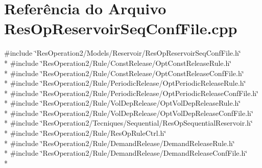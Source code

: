 \section{Referência do Arquivo Res\+Op\+Reservoir\+Seq\+Conf\+File.\+cpp}
\label{_res_op_reservoir_seq_conf_file_8cpp}
{\ttfamily \#include \char`\"{}Res\+Operation2/\+Models/\+Reservoir/\+Res\+Op\+Reservoir\+Seq\+Conf\+File.\+h\char`\"{}}\\*
{\ttfamily \#include \char`\"{}Res\+Operation2/\+Rule/\+Const\+Release/\+Opt\+Const\+Release\+Rule.\+h\char`\"{}}\\*
{\ttfamily \#include \char`\"{}Res\+Operation2/\+Rule/\+Const\+Release/\+Opt\+Const\+Release\+Conf\+File.\+h\char`\"{}}\\*
{\ttfamily \#include \char`\"{}Res\+Operation2/\+Rule/\+Periodic\+Release/\+Opt\+Periodic\+Release\+Rule.\+h\char`\"{}}\\*
{\ttfamily \#include \char`\"{}Res\+Operation2/\+Rule/\+Periodic\+Release/\+Opt\+Periodic\+Release\+Conf\+File.\+h\char`\"{}}\\*
{\ttfamily \#include \char`\"{}Res\+Operation2/\+Rule/\+Vol\+Dep\+Release/\+Opt\+Vol\+Dep\+Release\+Rule.\+h\char`\"{}}\\*
{\ttfamily \#include \char`\"{}Res\+Operation2/\+Rule/\+Vol\+Dep\+Release/\+Opt\+Vol\+Dep\+Release\+Conf\+File.\+h\char`\"{}}\\*
{\ttfamily \#include \char`\"{}Res\+Operation2/\+Tecniques/\+Sequential/\+Res\+Op\+Sequential\+Reservoir.\+h\char`\"{}}\\*
{\ttfamily \#include \char`\"{}Res\+Operation2/\+Rule/\+Res\+Op\+Rule\+Ctrl.\+h\char`\"{}}\\*
{\ttfamily \#include \char`\"{}Res\+Operation2/\+Rule/\+Demand\+Release/\+Demand\+Release\+Rule.\+h\char`\"{}}\\*
{\ttfamily \#include \char`\"{}Res\+Operation2/\+Rule/\+Demand\+Release/\+Demand\+Release\+Conf\+File.\+h\char`\"{}}\\*
